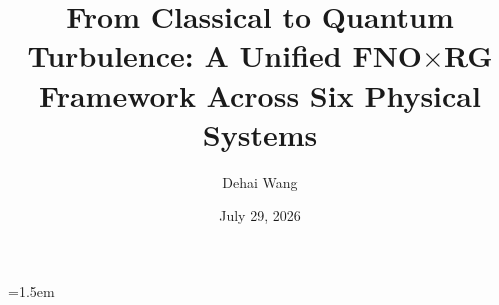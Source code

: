 \usepackage[utf8]{inputenc}
\usepackage[T1]{fontenc}
\usepackage{amsmath,amssymb,amsfonts}
\usepackage{graphicx}
\usepackage{booktabs}
\usepackage{multirow}
\usepackage{bm}
\usepackage{xcolor}
\usepackage{hyperref}
\usepackage{cleveref}
\usepackage{physics}
\usepackage{amsthm}
\usepackage{adjustbox}
\renewcommand{\qedsymbol}{}%
\newtheorem{theorem}{Theorem}[section]
\newtheorem{lemma}{Lemma}[section]
\theoremstyle{definition}
\newtheorem{definition}{Definition}[section]
\usepackage[all]{xy}

\newcommand{\avg}[1]{\langle #1 \rangle}
\newcommand{\pdiff}[2]{\frac{\partial #1}{\partial #2}}
\renewcommand{\dd}[2]{\frac{d#1}{d#2}}
\newenvironment{rem}[1][]{\begin{quote}\noindent\textbf{Remark} (#1). \itshape}{\end{quote}}
\newcommand{\FNO}{\text{FNO}}
\newcommand{\RG}{\text{RG}}
\newcommand{\NS}{\text{NS}}
\newcommand{\MHD}{\text{MHD}}
\newcommand{\KS}{\text{KS}}
\newcommand{\LN}{\text{LN}}
\newcommand{\KOL}{\text{K41}}
\newcommand{\BO}{\text{BO}}
\newcommand{\IK}{\text{IK}}
\newcommand{\GS}{\text{GS}}
\newcommand{\NATFP}{\text{NATFP}}
\newcommand{\PATFP}{\text{PATFP}}
\newcommand{\SL}{\text{SL}}
\newcommand{\Ma}{\mathrm{Ma}}
\newcommand{\Rey}{\mathrm{Re}}
\newcommand{\Fr}{\mathrm{Fr}}
\newcommand{\etanu}{\eta_\nu}
\newcommand{\kappafr}{\kappa_f}
\newcommand{\gammaanom}{\gamma_{\mathrm{anom}}}


\hypersetup{hidelinks,colorlinks=false}
\emergencystretch=1.5em
\sloppy


\title{From Classical to Quantum Turbulence: A Unified FNO\texorpdfstring{$\times$}{x}RG Framework Across Six Physical Systems}

\author{Dehai Wang}

\date{July 29, 2026}

